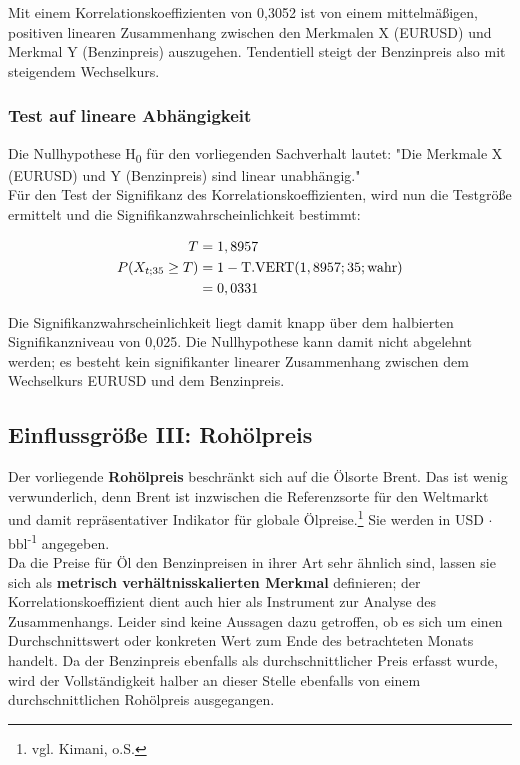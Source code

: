 Mit einem Korrelationskoeffizienten von 0,3052 ist von einem mittelmäßigen, positiven linearen Zusammenhang zwischen den Merkmalen X (EURUSD) und Merkmal Y (Benzinpreis) auszugehen. Tendentiell steigt der Benzinpreis also mit steigendem Wechselkurs.

\subsubsection{Test auf lineare Abhängigkeit}
Die Nullhypothese H\textsubscript{0} für den vorliegenden Sachverhalt lautet: "Die Merkmale X (EURUSD) und Y (Benzinpreis) sind linear unabhängig."\\
Für den Test der Signifikanz des Korrelationskoeffizienten, wird nun die Testgröße ermittelt und die Signifikanzwahrscheinlichkeit bestimmt:

\begin{align}
  T &= 1,8957\\
  P(X_{t;35} \geq T) &= 1 - \text{T.VERT}(1,8957; 35; \text{wahr})\\
                    &= 0,0331
\end{align}

Die Signifikanzwahrscheinlichkeit liegt damit knapp über dem halbierten Signifikanzniveau von 0,025. Die Nullhypothese kann damit nicht abgelehnt werden; es besteht kein signifikanter linearer Zusammenhang zwischen dem Wechselkurs EURUSD und dem Benzinpreis.



\subsection{Einflussgröße III: Rohölpreis}
Der vorliegende \textbf{Rohölpreis} beschränkt sich auf die Ölsorte Brent. Das ist wenig verwunderlich, denn Brent ist inzwischen die Referenzsorte für den Weltmarkt und damit repräsentativer Indikator für globale Ölpreise.\footnote{vgl. Kimani, o.S.} Sie werden in USD $\cdot$ bbl\textsuperscript{-1} angegeben.\\
Da die Preise für Öl den Benzinpreisen in ihrer Art sehr ähnlich sind, lassen sie sich als \textbf{metrisch verhältnisskalierten Merkmal} definieren; der Korrelationskoeffizient dient auch hier als Instrument zur Analyse des Zusammenhangs. Leider sind keine Aussagen dazu getroffen, ob es sich um einen Durchschnittswert oder konkreten Wert zum Ende des betrachteten Monats handelt. Da der Benzinpreis ebenfalls als durchschnittlicher Preis erfasst wurde, wird der Vollständigkeit halber an dieser Stelle ebenfalls von einem durchschnittlichen Rohölpreis ausgegangen.\\

